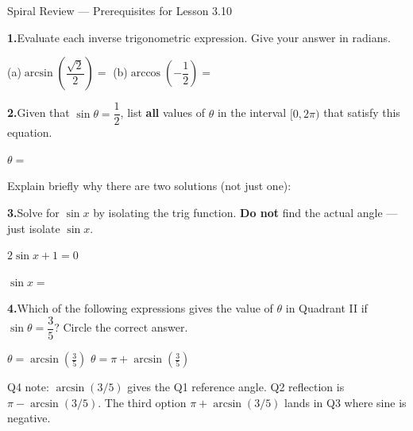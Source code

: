 \documentclass[10pt]{article}
\begin{document}
\namedateperiod

\vspace{0.10in}

\begin{notesbox}{Spiral Review --- Prerequisites for Lesson 3.10}

\textbf{1.}\quad Evaluate each inverse trigonometric expression.
Give your answer in radians.

\vspace{4pt}
(a)\quad $\arcsin\!\left(\dfrac{\sqrt{2}}{2}\right) = $ 
\hspace{1cm}
(b)\quad $\arccos\!\left(-\dfrac{1}{2}\right) = $ 

\vspace{0.14in}
\textbf{2.}\quad Given that $\sin\theta = \dfrac{1}{2}$, list \textbf{all}
values of $\theta$ in the interval $[0, 2\pi)$ that satisfy this equation.

\vspace{4pt}
$\theta = $ 

\vspace{4pt}
Explain briefly why there are two solutions (not just one):

\vspace{0.14in}
\textbf{3.}\quad Solve for $\sin x$ by isolating the trig function.
\textbf{Do not} find the actual angle --- just isolate $\sin x$.

\vspace{4pt}
\hspace{1em}$2\sin x + 1 = 0$

\vspace{6pt}
$\sin x = $ 

\vspace{0.14in}
\textbf{4.}\quad Which of the following expressions gives the value of
$\theta$ in Quadrant II if $\sin\theta = \dfrac{3}{5}$?
Circle the correct answer.

\vspace{4pt}
\hspace{2em}
$\displaystyle\theta = \arcsin\!\!\left(\tfrac{3}{5}\right)$
\hspace{2em}
\hspace{2em}
$\displaystyle\theta = \pi + \arcsin\!\!\left(\tfrac{3}{5}\right)$

\begin{teachernote}
Q4 note: $\arcsin(3/5)$ gives the Q1 reference angle. Q2 reflection is
$\pi - \arcsin(3/5)$. The third option $\pi + \arcsin(3/5)$ lands in Q3
where sine is negative.
\end{teachernote}

\end{notesbox}
\end{document}
